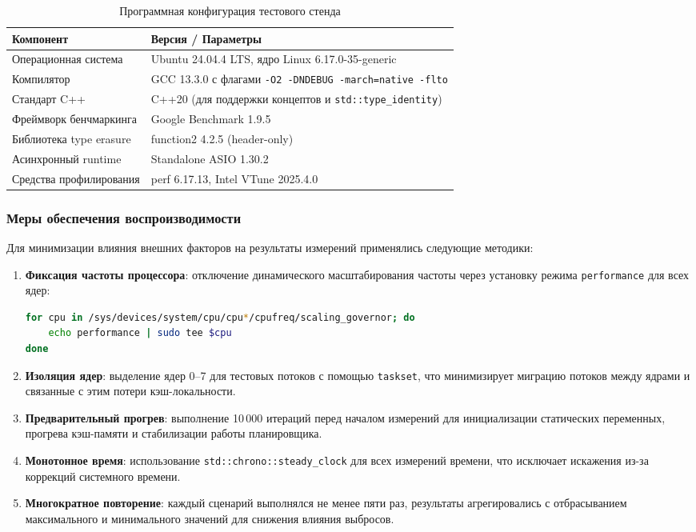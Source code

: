 \begin{table}[H]
\centering
\caption{Программная конфигурация тестового стенда}
\label{tab:software_config}
\begin{tabularx}{\textwidth}{lX}
\toprule
\textbf{Компонент} & \textbf{Версия / Параметры} \\
\midrule
Операционная система & Ubuntu 24.04.4 LTS, ядро Linux 6.17.0-35-generic \\
Компилятор & GCC 13.3.0 с флагами \texttt{-O2 -DNDEBUG -march=native -flto} \\
Стандарт C++ & C++20 (для поддержки концептов и \texttt{std::type\_identity}) \\
Фреймворк бенчмаркинга & Google Benchmark 1.9.5 \\
Библиотека type erasure & function2 4.2.5 (header-only) \\
Асинхронный runtime & Standalone ASIO 1.30.2 \\
Средства профилирования & perf 6.17.13, Intel VTune 2025.4.0 \\
\bottomrule
\end{tabularx}
\end{table}

\subsubsection{Меры обеспечения воспроизводимости}

Для минимизации влияния внешних факторов на результаты измерений применялись следующие методики:

\begin{enumerate}
    \item \textbf{Фиксация частоты процессора}: отключение динамического масштабирования частоты через установку режима \texttt{performance} для всех ядер:
    \begin{lstlisting}[language=bash, basicstyle=\ttfamily\small]
for cpu in /sys/devices/system/cpu/cpu*/cpufreq/scaling_governor; do
    echo performance | sudo tee $cpu
done
    \end{lstlisting}

    \item \textbf{Изоляция ядер}: выделение ядер 0--7 для тестовых потоков с помощью \texttt{taskset}, что минимизирует миграцию потоков между ядрами и связанные с этим потери кэш-локальности.

    \item \textbf{Предварительный прогрев}: выполнение 10\,000 итераций перед началом измерений для инициализации статических переменных, прогрева кэш-памяти и стабилизации работы планировщика.

    \item \textbf{Монотонное время}: использование \texttt{std::chrono::steady\_clock} для всех измерений времени, что исключает искажения из-за коррекций системного времени.

    \item \textbf{Многократное повторение}: каждый сценарий выполнялся не менее пяти раз, результаты агрегировались с отбрасыванием максимального и минимального значений для снижения влияния выбросов.
\end{enumerate}

